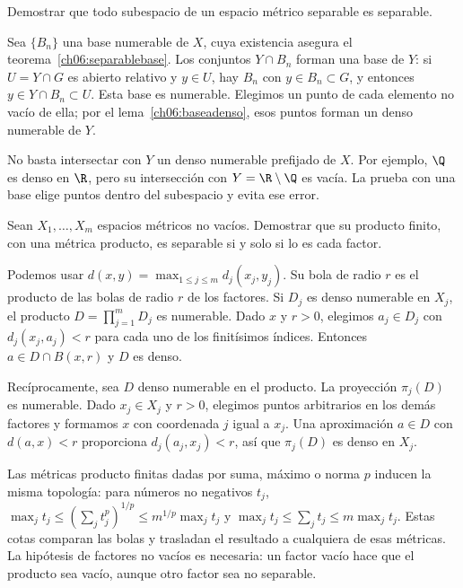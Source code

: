 \begin{ejercicio}
Demostrar que todo subespacio de un espacio métrico separable es separable.
\end{ejercicio}
\begin{solucion}
Sea $\{B_n\}$ una base numerable de $X$, cuya existencia asegura el teorema~\ref{ch06:separablebase}. Los conjuntos $Y\cap B_n$ forman una base de $Y$: si $U=Y\cap G$ es abierto relativo y $y\in U$, hay $B_n$ con $y\in B_n\subset G$, y entonces $y\in Y\cap B_n\subset U$. Esta base es numerable. Elegimos un punto de cada elemento no vacío de ella; por el lema~\ref{ch06:baseadenso}, esos puntos forman un denso numerable de $Y$.

No basta intersectar con $Y$ un denso numerable prefijado de $X$. Por ejemplo, $\Q$ es denso en $\R$, pero su intersección con $Y=\R\setminus\Q$ es vacía. La prueba con una base elige puntos dentro del subespacio y evita ese error.
\end{solucion}

\begin{ejercicio}
Sean $X_1,\ldots,X_m$ espacios métricos no vacíos. Demostrar que su producto finito, con una métrica producto, es separable si y solo si lo es cada factor.
\end{ejercicio}
\begin{solucion}
Podemos usar $d(x,y)=\max_{1\le j\le m}d_j(x_j,y_j)$. Su bola de radio $r$ es el producto de las bolas de radio $r$ de los factores. Si $D_j$ es denso numerable en $X_j$, el producto $D=\prod_{j=1}^mD_j$ es numerable. Dado $x$ y $r>0$, elegimos $a_j\in D_j$ con $d_j(x_j,a_j)<r$ para cada uno de los finitísimos índices. Entonces $a\in D\cap B(x,r)$ y $D$ es denso.

Recíprocamente, sea $D$ denso numerable en el producto. La proyección $\pi_j(D)$ es numerable. Dado $x_j\in X_j$ y $r>0$, elegimos puntos arbitrarios en los demás factores y formamos $x$ con coordenada $j$ igual a $x_j$. Una aproximación $a\in D$ con $d(a,x)<r$ proporciona $d_j(a_j,x_j)<r$, así que $\pi_j(D)$ es denso en $X_j$.

Las métricas producto finitas dadas por suma, máximo o norma $p$ inducen la misma topología: para números no negativos $t_j$, $\max_jt_j\le(\sum_jt_j^p)^{1/p}\le m^{1/p}\max_jt_j$ y $\max_jt_j\le\sum_jt_j\le m\max_jt_j$. Estas cotas comparan las bolas y trasladan el resultado a cualquiera de esas métricas. La hipótesis de factores no vacíos es necesaria: un factor vacío hace que el producto sea vacío, aunque otro factor sea no separable.
\end{solucion}

